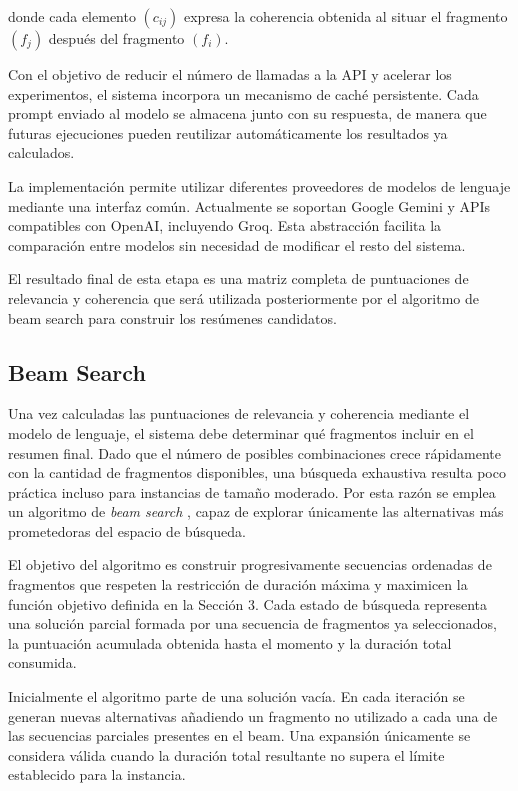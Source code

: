 \documentclass[12pt,a4paper]{article}
\begin{document}
donde cada elemento $(c_{ij})$ expresa la coherencia obtenida al situar el fragmento $(f_j)$ después del fragmento $(f_i)$.

Con el objetivo de reducir el número de llamadas a la API y acelerar los experimentos, el sistema incorpora un mecanismo de caché persistente. Cada prompt enviado al modelo se almacena junto con su respuesta, de manera que futuras ejecuciones pueden reutilizar automáticamente los resultados ya calculados.

La implementación permite utilizar diferentes proveedores de modelos de lenguaje mediante una interfaz común. Actualmente se soportan Google Gemini y APIs compatibles con OpenAI, incluyendo Groq. Esta abstracción facilita la comparación entre modelos sin necesidad de modificar el resto del sistema.

El resultado final de esta etapa es una matriz completa de puntuaciones de relevancia y coherencia que será utilizada posteriormente por el algoritmo de beam search para construir los resúmenes candidatos.


\subsection{Beam Search}

Una vez calculadas las puntuaciones de relevancia y coherencia mediante el modelo de lenguaje, el sistema debe determinar qué fragmentos incluir en el resumen final. Dado que el número de posibles combinaciones crece rápidamente con la cantidad de fragmentos disponibles, una búsqueda exhaustiva resulta poco práctica incluso para instancias de tamaño moderado. Por esta razón se emplea un algoritmo de \textit{beam search} \cite{russell2020aima}, capaz de explorar únicamente las alternativas más prometedoras del espacio de búsqueda.

El objetivo del algoritmo es construir progresivamente secuencias ordenadas de fragmentos que respeten la restricción de duración máxima y maximicen la función objetivo definida en la Sección 3. Cada estado de búsqueda representa una solución parcial formada por una secuencia de fragmentos ya seleccionados, la puntuación acumulada obtenida hasta el momento y la duración total consumida.

Inicialmente el algoritmo parte de una solución vacía. En cada iteración se generan nuevas alternativas añadiendo un fragmento no utilizado a cada una de las secuencias parciales presentes en el beam. Una expansión únicamente se considera válida cuando la duración total resultante no supera el límite establecido para la instancia.
\end{document}
